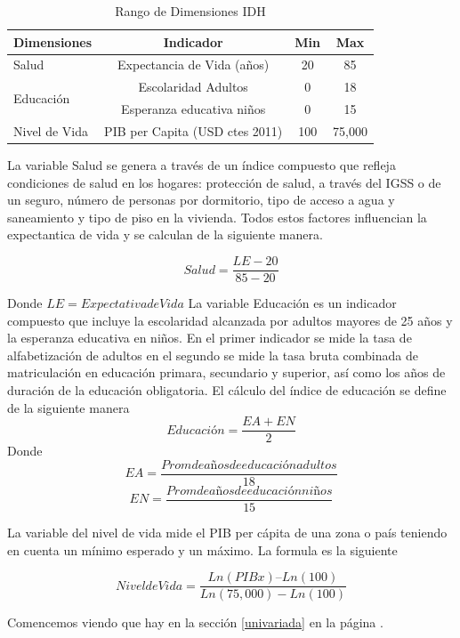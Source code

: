 \documentclass{article}
\begin{document}

\begin{table}[h!]
\centering
  \begin{tabular}{l c c c}
  \hline
  Dimensiones & Indicador & Min & Max \\ [0.25ex]
  \hline \hline
  Salud & Expectancia de Vida (años) & 20 & 85 \\
  \multirow{2}{*}{Educación} & Escolaridad Adultos & 0 & 18 \\ 
   & Esperanza educativa niños & 0 & 15 \\
  Nivel de Vida  & PIB per Capita (USD ctes 2011) & 100 & 75,000 \\
  \hline
  \end{tabular}
 \caption {Rango de Dimensiones IDH}
  \label{Tabla 1:}
\end {table} 

La variable Salud se genera a través de un índice compuesto que refleja condiciones de salud en los hogares: protección de salud, a través del IGSS o de un seguro, número de personas por dormitorio, tipo de acceso a agua y saneamiento y tipo de piso en la vivienda. Todos estos factores influencian la expectantica de vida y se calculan de la siguiente manera.

\[ Salud=\frac{LE-20} {85-20} \]

Donde $LE = Expectativa de Vida$
La variable Educación es un indicador compuesto que incluye la escolaridad alcanzada por adultos mayores de 25 años y la esperanza educativa en niños. En el primer indicador se mide la tasa de alfabetización de adultos en el segundo se mide la tasa bruta combinada de matriculación en educación primara, secundario y superior, así como los años de duración de la educación obligatoria. El cálculo del índice de educación se define de la siguiente manera
\[Educación= \frac{EA + EN} {2} \]
Donde
\[EA= \frac{Prom de años de educación adultos} {18}  \]
\[EN= \frac{Prom de años de educación niños} {15}  \]

La variable del nivel de vida mide el PIB per cápita de una zona o país teniendo en cuenta un mínimo esperado y un máximo. La formula es la siguiente

\[Nivel de Vida = \frac {Ln(PIBx) – Ln (100)} {Ln(75,000)-Ln(100)} \]





Comencemos viendo que hay en la sección \ref{univariada} en la página \pageref{univariada}.

\clearpage







%
%
\end{document}
